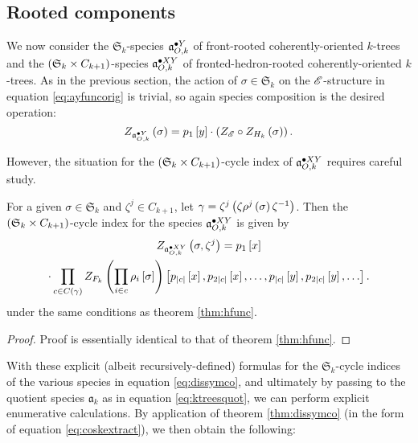 \documentclass[sectionflow,singlespace,twoside,boldmathhdr]{brandiss} %
\numberwithin{section}{chapter}
\numberwithin{figure}{chapter}
\begin{document}
\subsection{Rooted components}\label{ss:ktcycindroot}
We now consider the $\mathfrak{S}_{k}$-species $\pointed[Y]{\mathfrak{a}}_{O, k}$ of front-rooted coherently-oriented $k$-trees and the $\pbrac{\mathfrak{S}_{k} \times C_{k+1}}$-species $\pointed[XY]{\mathfrak{a}}_{O, k}$ of fronted-hedron-rooted coherently-oriented $k$-trees.
As in the previous section, the action of $\sigma \in \mathfrak{S}_{k}$ on the $\specname{E}$-structure in equation \eqref{eq:ayfuncorig} is trivial, so again species composition is the desired operation:
\begin{equation}
  \label{eq:ayfunc}
  Z_{\pointed[Y]{\mathfrak{a}}_{O, k}} \pbrac{\sigma} = p_{1} \sbrac{y} \cdot \pbrac{Z_{\specname{E}} \circ Z_{H_{k}} \pbrac{\sigma}}.
\end{equation}

However, the situation for the $\pbrac{\mathfrak{S}_{k} \times C_{k+1}}$-cycle index of $\pointed[XY]{\mathfrak{a}}_{O, k}$ requires careful study.
\begin{theorem}
  \label{thm:axyfunc}
  For a given $\sigma \in \mathfrak{S}_{k}$ and $\zeta^{j} \in C_{k+1}$, let $\gamma = \zeta^{j} \pbrac{\zeta \rho^{j} \pbrac{\sigma} \zeta^{-1}}$.
  Then the $\pbrac{\mathfrak{S}_{k} \times C_{k+1}}$-cycle index for the species $\pointed[XY]{\mathfrak{a}}_{O, k}$ is given by
  \begin{multline}
    \label{eq:axyfunc}
    Z_{\pointed[XY]{\mathfrak{a}}_{O, k}} \pbrac{\sigma, \zeta^{j}} = p_{1} \sbrac{x} \\
    \cdot \prod_{c \in C \pbrac{\gamma}} Z_{F_{k}} \pbrac{\prod_{i \in c} \rho_{i} \sbrac{\sigma}} \sbrac{p_{\abs{c}} \sbrac{x}, p_{2 \abs{c}} \sbrac{x}, \dots, p_{\abs{c}} \sbrac{y}, p_{2 \abs{c}} \sbrac{y}, \dots}.
  \end{multline}
  under the same conditions as theorem \ref{thm:hfunc}.
\end{theorem}

\begin{proof}
  Proof is essentially identical to that of theorem \ref{thm:hfunc}.
\end{proof}

With these explicit (albeit recursively-defined) formulas for the $\mathfrak{S}_{k}$-cycle indices of the various species in equation \eqref{eq:dissymco}, and ultimately by passing to the quotient species $\mathfrak{a}_{k}$ as in equation \eqref{eq:ktreesquot}, we can perform explicit enumerative calculations.
By application of theorem \ref{thm:dissymco} (in the form of equation \eqref{eq:coskextract}), we then obtain the following:
\end{document}
